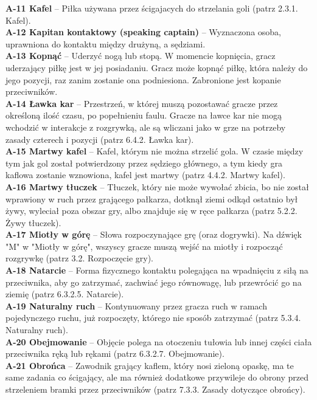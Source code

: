 \documentclass[11pt,a4paper]{article}
\begin{document}
\textbf{A-11 Kafel} – Piłka używana przez ścigajacych do strzelania goli (patrz 2.3.1. Kafel).\\
\textbf{A-12 Kapitan kontaktowy (speaking captain)} – Wyznaczona osoba, uprawniona do kontaktu między drużyną, a sędziami.\\
\textbf{A-13 Kopnąć} – Uderzyć nogą lub stopą. W momencie kopnięcia, gracz uderzający piłkę jest w jej posiadaniu. Gracz może kopnąć piłkę, która należy do jego pozycji, raz zanim zostanie ona podniesiona. Zabronione jest kopanie przeciwników.\\
\textbf{A-14 Ławka kar} – Przestrzeń, w której muszą pozostawać gracze przez określoną ilość czasu, po popełnieniu faulu. Gracze na ławce kar nie mogą wchodzić w interakcje z rozgrywką, ale są wliczani jako w grze na potrzeby zasady czterech i pozycji (patrz 6.4.2. Ławka kar).\\
\textbf{A-15 Martwy kafel} – Kafel, którym nie można strzelić gola. W czasie między tym jak gol został potwierdzony przez sędziego głównego, a tym kiedy gra kaflowa zostanie wznowiona, kafel jest martwy (patrz 4.4.2. Martwy kafel).\\
\textbf{A-16 Martwy tłuczek} – Tłuczek, który nie może wywołać zbicia, bo nie został wprawiony w ruch przez grającego pałkarza, dotknął ziemi odkąd ostatnio był żywy, wyleciał poza obszar gry, albo znajduje się w ręce pałkarza (patrz 5.2.2. Żywy tłuczek).\\
\textbf{A-17 Miotły w górę} – Słowa rozpoczynające grę (oraz dogrywki). Na dźwięk "M" w "Miotły w górę", wszyscy gracze muszą wejść na miotły i rozpocząć rozgrywkę (patrz 3.2. Rozpoczęcie gry).\\
\textbf{A-18 Natarcie} – Forma fizycznego kontaktu polegająca na wpadnięciu z siłą na przeciwnika, aby go zatrzymać, zachwiać jego równowagę, lub przewrócić go na ziemię (patrz 6.3.2.5. Natarcie).\\
\textbf{A-19 Naturalny ruch} – Kontynuowany przez gracza ruch w ramach pojedynczego ruchu, już rozpoczęty, którego nie sposób zatrzymać (patrz 5.3.4. Naturalny ruch).\\
\textbf{A-20 Obejmowanie} – Objęcie polega na otoczeniu tułowia lub innej części ciała przeciwnika ręką lub rękami (patrz 6.3.2.7. Obejmowanie).\\
\textbf{A-21 Obrońca} – Zawodnik grający kaflem, który nosi zieloną opaskę, ma te same zadania co ścigający, ale ma również dodatkowe przywileje do obrony przed strzeleniem bramki przez przeciwników (patrz 7.3.3. Zasady dotyczące obrońcy).\\
\end{document}
